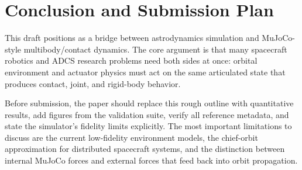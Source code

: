 \section{Conclusion and Submission Plan}
\label{sec:conclusion}

This draft positions \mjorbit{} as a bridge between astrodynamics simulation
and MuJoCo-style multibody/contact dynamics. The core argument is that many
spacecraft robotics and ADCS research problems need both sides at once:
orbital environment and actuator physics must act on the same articulated
state that produces contact, joint, and rigid-body behavior.

Before submission, the paper should replace this rough outline with
quantitative results, add figures from the validation suite, verify all
reference metadata, and state the simulator's fidelity limits explicitly.
The most important limitations to discuss are the current low-fidelity
environment models, the chief-orbit approximation for distributed spacecraft
systems, and the distinction between internal MuJoCo forces and external
forces that feed back into orbit propagation.
